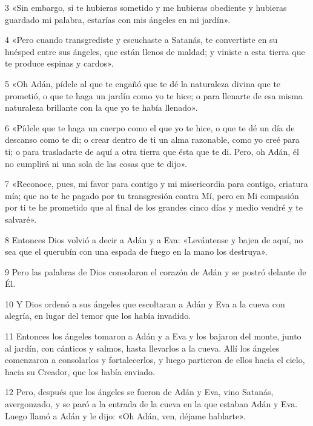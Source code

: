 \par 3 «Sin embargo, si te hubieras sometido y me hubieras obediente y hubieras guardado mi palabra, estarías con mis ángeles en mi jardín».

\par 4 «Pero cuando transgrediste y escuchaste a Satanás, te convertiste en su huésped entre sus ángeles, que están llenos de maldad; y viniste a esta tierra que te produce espinas y cardos».

\par 5 «Oh Adán, pídele al que te engañó que te dé la naturaleza divina que te prometió, o que te haga un jardín como yo te hice; o para llenarte de esa misma naturaleza brillante con la que yo te había llenado».

\par 6 «Pídele que te haga un cuerpo como el que yo te hice, o que te dé un día de descanso como te di; o crear dentro de ti un alma razonable, como yo creé para ti; o para trasladarte de aquí a otra tierra que ésta que te di. Pero, oh Adán, él no cumplirá ni una sola de las cosas que te dijo».

\par 7 «Reconoce, pues, mi favor para contigo y mi misericordia para contigo, criatura mía; que no te he pagado por tu transgresión contra Mí, pero en Mi compasión por ti te he prometido que al final de los grandes cinco días y medio vendré y te salvaré».

\par 8 Entonces Dios volvió a decir a Adán y a Eva: «Levántense y bajen de aquí, no sea que el querubín con una espada de fuego en la mano los destruya».

\par 9 Pero las palabras de Dios consolaron el corazón de Adán y se postró delante de Él.

\par 10 Y Dios ordenó a sus ángeles que escoltaran a Adán y Eva a la cueva con alegría, en lugar del temor que los había invadido.

\par 11 Entonces los ángeles tomaron a Adán y a Eva y los bajaron del monte, junto al jardín, con cánticos y salmos, hasta llevarlos a la cueva. Allí los ángeles comenzaron a consolarlos y fortalecerlos, y luego partieron de ellos hacia el cielo, hacia su Creador, que los había enviado.

\par 12 Pero, después que los ángeles se fueron de Adán y Eva, vino Satanás, avergonzado, y se paró a la entrada de la cueva en la que estaban Adán y Eva. Luego llamó a Adán y le dijo: «Oh Adán, ven, déjame hablarte».


